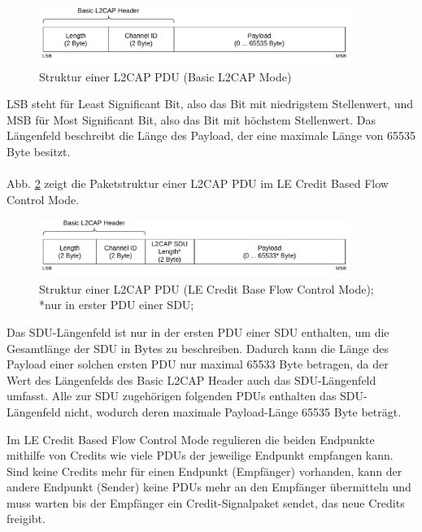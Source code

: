 \begin{figure}[H]
    \centering
    \includegraphics[width=0.9\textwidth]{graphics/l2cap_datenpaket.pdf}
    \caption[Struktur einer L2CAP PDU (Basic L2CAP Mode)]{Struktur einer L2CAP PDU (Basic L2CAP Mode) \cite{BtSpec4.2_fig_1737}}
    \label{fig: l2cap pdu basic}
\end{figure}

LSB steht für Least Significant Bit, also das Bit mit niedrigstem Stellenwert, und MSB für Most Significant Bit, also das Bit mit höchstem Stellenwert. Das Längenfeld beschreibt die Länge des Payload, der eine maximale Länge von 65535 Byte besitzt.
\\\\
Abb. \ref{fig: l2cap pdu credit} zeigt die Paketstruktur einer L2CAP PDU im LE Credit Based Flow Control Mode.

\begin{figure}
    \centering
    \includegraphics[width=0.9\textwidth]{graphics/l2cap_datenpaket_credit_based.pdf}
    \caption[Struktur einer L2CAP PDU (LE Credit Base Flow Control Mode)]{Struktur einer L2CAP PDU (LE Credit Base Flow Control Mode); *nur in erster PDU einer SDU; \cite{BtSpec4.2_fig_1747}}
    \label{fig: l2cap pdu credit}
\end{figure}

Das SDU-Längenfeld ist nur in der ersten PDU einer SDU enthalten, um die Gesamtlänge der SDU in Bytes zu beschreiben. Dadurch kann die Länge des Payload einer solchen ersten PDU nur maximal 65533 Byte betragen, da der Wert des Längenfelds des Basic L2CAP Header auch das SDU-Längenfeld umfasst. Alle zur SDU zugehörigen folgenden PDUs enthalten das SDU-Längenfeld nicht, wodurch deren maximale Payload-Länge 65535 Byte beträgt.

Im LE Credit Based Flow Control Mode regulieren die beiden Endpunkte mithilfe von Credits wie viele PDUs der jeweilige Endpunkt empfangen kann. Sind keine Credits mehr für einen Endpunkt (Empfänger) vorhanden, kann der andere Endpunkt (Sender) keine PDUs mehr an den Empfänger übermitteln und muss warten bis der Empfänger ein Credit-Signalpaket sendet, das neue Credits freigibt. \cite{BtSpec4.2_1780}
